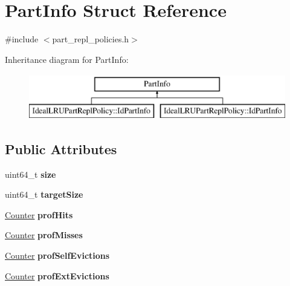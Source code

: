 \hypertarget{structPartInfo}{\section{Part\-Info Struct Reference}
\label{structPartInfo}
}


{\ttfamily \#include $<$part\-\_\-repl\-\_\-policies.\-h$>$}

Inheritance diagram for Part\-Info\-:\begin{figure}[H]
\begin{center}
\leavevmode
\includegraphics[height=2.000000cm]{structPartInfo}
\end{center}
\end{figure}
\subsection*{Public Attributes}
\begin{DoxyCompactItemize}
\item 
\hypertarget{structPartInfo_a66a39c13b2e4e12ccaef9afa90abcdee}{uint64\-\_\-t {\bfseries size}}\label{structPartInfo_a66a39c13b2e4e12ccaef9afa90abcdee}

\item 
\hypertarget{structPartInfo_a23ea221bc3d7b1f6b3d3fcf89e7303f9}{uint64\-\_\-t {\bfseries target\-Size}}\label{structPartInfo_a23ea221bc3d7b1f6b3d3fcf89e7303f9}

\item 
\hypertarget{structPartInfo_a04e76b69eb7891b240e3d9df70b1230a}{\hyperlink{classCounter}{Counter} {\bfseries prof\-Hits}}\label{structPartInfo_a04e76b69eb7891b240e3d9df70b1230a}

\item 
\hypertarget{structPartInfo_aad485ed8a3f92974c7e35e0548f7b6d0}{\hyperlink{classCounter}{Counter} {\bfseries prof\-Misses}}\label{structPartInfo_aad485ed8a3f92974c7e35e0548f7b6d0}

\item 
\hypertarget{structPartInfo_afc821c7caa7e2b07ae784bf453a0a13f}{\hyperlink{classCounter}{Counter} {\bfseries prof\-Self\-Evictions}}\label{structPartInfo_afc821c7caa7e2b07ae784bf453a0a13f}

\item 
\hypertarget{structPartInfo_a606cd947c710ee3b5ad4005332255a6e}{\hyperlink{classCounter}{Counter} {\bfseries prof\-Ext\-Evictions}}\label{structPartInfo_a606cd947c710ee3b5ad4005332255a6e}

\end{DoxyCompactItemize}


